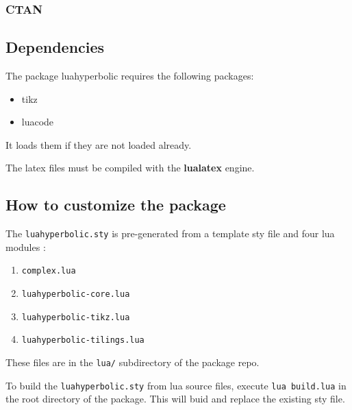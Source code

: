 \documentclass{article}
\begin{document}
\subsubsection*{CTAN} 


\subsection{Dependencies}

The package luahyperbolic  requires the following packages:
\begin{itemize}
\item tikz
\item luacode
\end{itemize}
It loads them if they are not loaded already.

 The latex files must be compiled with the \textbf{lualatex} engine.

\subsection{How to customize the package}

The \texttt{luahyperbolic.sty}  is pre-generated from a template sty file and four lua modules :
\begin{enumerate}
\item \texttt{complex.lua}
\item \texttt{luahyperbolic-core.lua}
\item \texttt{luahyperbolic-tikz.lua}
\item \texttt{luahyperbolic-tilings.lua}
\end{enumerate}

These files are in the \texttt{lua/} subdirectory of the package repo. 

To build the \texttt{luahyperbolic.sty} from lua source files, execute \texttt{lua build.lua} in the root directory of the package.
This will buid and replace the existing sty file.


%
%
% 
\end{document}

